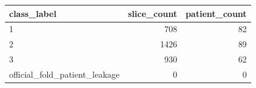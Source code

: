 \begin{tabular}{lrr}
\toprule
class_label & slice_count & patient_count \\
\midrule
1 & 708 & 82 \\
2 & 1426 & 89 \\
3 & 930 & 62 \\
official_fold_patient_leakage & 0 & 0 \\
\bottomrule
\end{tabular}

